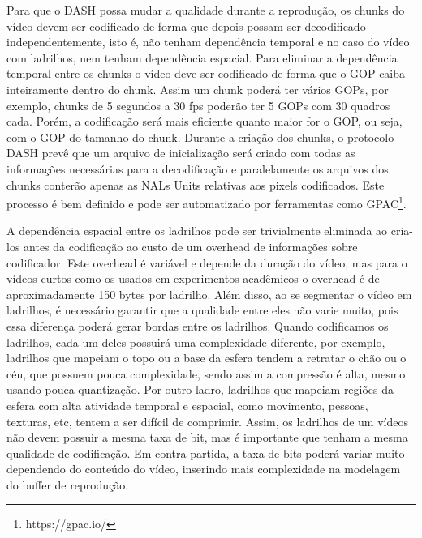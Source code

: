 Para que o DASH possa mudar a qualidade durante a reprodução, os chunks do vídeo devem ser codificado de forma que depois possam ser decodificado independentemente, isto é, não tenham dependência temporal e no caso do vídeo com ladrilhos, nem tenham dependência espacial. Para eliminar a dependência temporal entre os chunks o vídeo deve ser codificado de forma que o GOP caiba inteiramente dentro do chunk. Assim um chunk poderá ter vários GOPs, por exemplo, chunks de 5 segundos a 30 fps poderão ter 5 GOPs com 30 quadros cada. Porém, a codificação será mais eficiente quanto maior for o GOP, ou seja, com o GOP do tamanho do chunk. Durante a criação dos chunks, o protocolo DASH prevê que um arquivo de inicialização será criado com todas as informações necessárias para a decodificação e paralelamente os arquivos dos chunks conterão apenas as NALs Units relativas aos pixels codificados. Este processo é bem definido e pode ser automatizado por ferramentas como GPAC\footnote{https://gpac.io/}.

A dependência espacial entre os ladrilhos pode ser trivialmente eliminada ao cria-los antes da codificação ao custo de um overhead de informações sobre codificador. Este overhead é variável e depende da duração do vídeo, mas para o vídeos curtos como os usados em experimentos acadêmicos o overhead é de aproximadamente 150 bytes por ladrilho. Além disso, ao se segmentar o vídeo em ladrilhos, é necessário garantir que a qualidade entre eles não varie muito, pois essa diferença poderá gerar bordas entre os ladrilhos. Quando codificamos os ladrilhos, cada um deles possuirá uma complexidade diferente, por exemplo, ladrilhos que mapeiam o topo ou a base da esfera tendem a retratar o chão ou o céu, que possuem pouca complexidade, sendo assim a compressão é alta, mesmo usando pouca quantização. Por outro ladro, ladrilhos que mapeiam regiões da esfera com alta atividade temporal e espacial, como movimento, pessoas, texturas, etc, tentem a ser difícil de comprimir. Assim, os ladrilhos de um vídeos não devem possuir a mesma taxa de bit, mas é importante que tenham a mesma qualidade de codificação. Em contra partida, a taxa de bits poderá variar muito dependendo do conteúdo do vídeo, inserindo mais complexidade na modelagem do buffer de reprodução.

